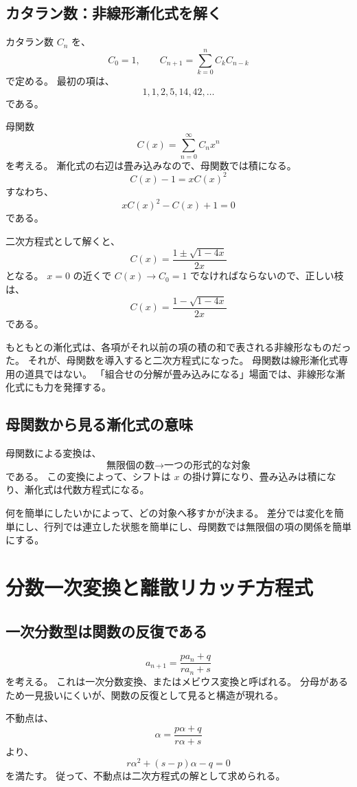 \subsection{カタラン数：非線形漸化式を解く}

カタラン数 $C_n$ を、
\[
  C_0=1,\qquad
  C_{n+1}=\sum_{k=0}^{n}C_kC_{n-k}
\]
で定める。
最初の項は、
\[
  1,1,2,5,14,42,\ldots
\]
である。

母関数
\[
  C(x)=\sum_{n=0}^{\infty}C_nx^n
\]
を考える。
漸化式の右辺は畳み込みなので、母関数では積になる。
\[
  C(x)-1=xC(x)^2
\]
すなわち、
\[
  xC(x)^2-C(x)+1=0
\]
である。

二次方程式として解くと、
\[
  C(x)=\frac{1\pm\sqrt{1-4x}}{2x}
\]
となる。
$x=0$ の近くで $C(x)\to C_0=1$ でなければならないので、正しい枝は、
\[
  C(x)=\frac{1-\sqrt{1-4x}}{2x}
\]
である。

もともとの漸化式は、各項がそれ以前の項の積の和で表される非線形なものだった。
それが、母関数を導入すると二次方程式になった。
母関数は線形漸化式専用の道具ではない。
「組合せの分解が畳み込みになる」場面では、非線形な漸化式にも力を発揮する。

\subsection{母関数から見る漸化式の意味}

母関数による変換は、
\[
  \text{無限個の数}
  \longrightarrow
  \text{一つの形式的な対象}
\]
である。
この変換によって、シフトは $x$ の掛け算になり、畳み込みは積になり、漸化式は代数方程式になる。

何を簡単にしたいかによって、どの対象へ移すかが決まる。
差分では変化を簡単にし、行列では連立した状態を簡単にし、母関数では無限個の項の関係を簡単にする。

\section{分数一次変換と離散リカッチ方程式}

\subsection{一次分数型は関数の反復である}

\[
  a_{n+1}=\frac{pa_n+q}{ra_n+s}
\]
を考える。
これは一次分数変換、またはメビウス変換と呼ばれる。
分母があるため一見扱いにくいが、関数の反復として見ると構造が現れる。

不動点は、
\[
  \alpha=\frac{p\alpha+q}{r\alpha+s}
\]
より、
\[
  r\alpha^2+(s-p)\alpha-q=0
\]
を満たす。
従って、不動点は二次方程式の解として求められる。

